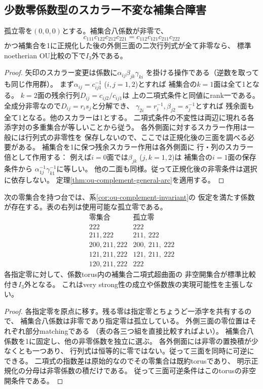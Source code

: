 \subsection{少数零係数型のスカラー不変な補集合障害}
\begin{corollary}[補集合の二項式による排除]
\label{cor:ou-complement-invariant}
孤立零を$(0,0,0)$とする。補集合八係数が非零で、
\[
 c_{111}c_{122}c_{212}c_{221}
 =c_{112}c_{121}c_{211}c_{222}
\]
かつ補集合を1に正規化した後の外側三面の二次行列式が全て非零なら、
標準noetherian OU比較の下で$I_3$外である。
\end{corollary}
\begin{proof}
矢印のスカラー変更は係数に$\alpha_{ij}\beta_{jk}\gamma_{ki}$
を掛ける操作である（逆数を取っても同じ作用群）。
まず$\alpha_{ij}=c_{ij1}^{-1}$ ($i,j=1,2$)とすれば
補集合の$k=1$面は全て1となる。
$k=2$面の残余行列$D_{ij}=c_{ij2}/c_{ij1}$は
上の二項式条件と同値にrank一である。
全成分非零なので$D_{ij}=r_i s_j$と分解でき、
$\gamma_{2i}=r_i^{-1},\beta_{j2}=s_j^{-1}$とすれば
残余面も全て1となる。他のスカラーは1とする。
二項式条件の不変性は両辺に現れる各添字対の多重集合が等しいことから従う。
各外側面に対するスカラー作用は一般には行列式の非零性を
保存しないので、ここでは正規化後の三面を調べる必要がある。
補集合を1に保つ残余スカラー作用は各外側面に
行・列のスカラー倍として作用する：
例えば$i=0$面では$\beta_{jk}$ ($j,k=1,2$)は
補集合の$i=1$面の保存条件から
$\alpha_{1j}^{-1}\gamma_{k1}^{-1}$に等しい。
他の二面も同様。従って正規化後の非零条件は選択に依存しない。
定理\ref{thm:ou-complement-general-arc}を適用する。
\end{proof}

\begin{proposition}[少数零係数型における補集合障害の非空範囲]
\label{prop:ou-small-zero-complement-loci}
次の零集合を持つ台では、系\ref{cor:ou-complement-invariant}の
仮定を満たす係数が存在する。表の右列は使用可能な孤立零である。
\[
\begin{array}{c|l}
\text{零集合}&\text{孤立零}\\\hline
222&222\\
211,222&211,\ 222\\
200,211,222&200,\ 211,\ 222\\
121,211,222&121,\ 211,\ 222\\
120,211,222&222
\end{array}
\]
各指定零に対して、係数torus内の補集合二項式超曲面の
非空開集合が標準比較付き$I_3$外となる。
これはvery strong性の成立や係数族の実現可能性を主張しない。
\end{proposition}
\begin{proof}
各指定零を原点に移す。残る零は指定零とちょうど一添字を共有するので、
補集合八係数は非零であり指定零は孤立している。
外側三面の零位置はそれぞれ部分matchingである
（表の各三つ組を直接比較すればよい）。
補集合八係数を1に固定し、他の非零係数を独立に選ぶ。
各外側面には非零の置換積が少なくとも一つあり、
行列式は恒等的に零ではない。従って三面を同時に可逆にできる。
二項式の指数差は原始的なのでその零集合は既約torusであり、
明示正規化の分母は非零係数の積だけである。
従って三面可逆条件はこのtorusの非空開条件である。
\end{proof}

